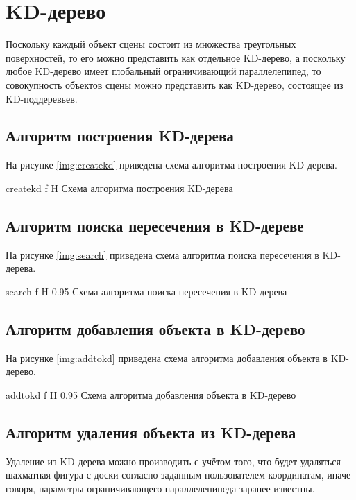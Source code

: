 \section{KD-дерево}

Поскольку каждый объект сцены состоит из множества треугольных поверхностей, то его можно представить как отдельное KD-дерево, а поскольку любое KD-дерево имеет глобальный ограничивающий параллелепипед, то совокупность объектов сцены можно представить как KD-дерево, состоящее из KD-поддеревьев.

\subsection{Алгоритм построения KD-дерева}

На рисунке \ref{img:createkd} приведена схема алгоритма построения KD-дерева.

{createkd}
{f}
{H}
{\textwidth}
{Схема алгоритма построения KD-дерева}

\subsection{Алгоритм поиска пересечения в KD-дереве}

На рисунке \ref{img:search} приведена схема алгоритма поиска пересечения в KD-дерева.

{search}
{f}
{H}
{0.95\textwidth}
{Схема алгоритма поиска пересечения в KD-дерева}

\subsection{Алгоритм добавления объекта в KD-дерево}

На рисунке \ref{img:addtokd} приведена схема алгоритма добавления объекта в KD-дерево.

{addtokd}
{f}
{H}
{0.95\textwidth}
{Схема алгоритма добавления объекта в KD-дерево}

\subsection{Алгоритм удаления объекта из KD-дерева}

Удаление из KD-дерева можно производить с учётом того, что будет удаляться шахматная фигура с доски согласно заданным пользователем координатам, иначе говоря, параметры ограничивающего параллелепипеда заранее известны.

